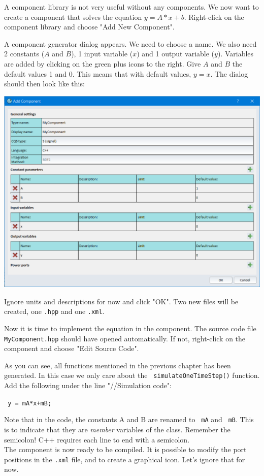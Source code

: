 \documentclass[a4paper,pdftex]{article}
\newcommand\code[1]{\setlength\emergencystretch{3cm} \texttt{\color{blue} #1}}
\begin{document}
\begin{tutenumerate}
A component library is not very useful without any components.
We now want to create a component that solves the equation $y = A*x+b$.
Right-click on the component library and choose "Add New Component".

A component generator dialog appears. 
We need to choose a name.
We also need 2 constants ($A$ and $B$), 1 input variable ($x$) and 1 output variable ($y$).
Variables are added by clicking on the green plus icons to the right.
Give $A$ and $B$ the default values 1 and 0.
This means that with default values, $y = x$.
The dialog should then look like this:

\includegraphics[width=\linewidth]{gfx/writingcomponents/newcomponent.png}

Ignore units and descriptions for now and click "OK".
Two new files will be created, one \texttt{.hpp} and one \texttt{.xml}.

Now it is time to implement the equation in the component.
The source code file \texttt{MyComponent.hpp} should have opened automatically. If not, right-click on the component and choose "Edit Source Code".

As you can see, all functions mentioned in the previous chapter has been generated.
In this case we only care about the \code{simulateOneTimeStep()} function.
Add the following under the line "//Simulation code":
 
 \code{y = mA*x+mB;} 
 
 Note that in the code, the constants A and B are renamed to \code{mA} and \code{mB}. This is to indicate that they are \textit{member} variables of the class.
Remember the semicolon!
C++ requires each line to end with a semicolon.\\
\newline\noindent
The component is now ready to be compiled. 
It is possible to modify the port positions in the \texttt{.xml} file, and to create a graphical icon.
Let's ignore that for now.


\end{tutenumerate}
\end{document}
